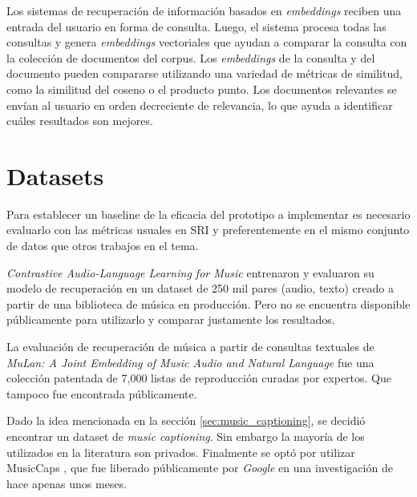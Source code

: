 Los sistemas de recuperación de información basados en \textit{embeddings} reciben una entrada del usuario en forma de consulta. Luego, el sistema procesa todas las consultas y genera \textit{embeddings} vectoriales que ayudan a comparar la consulta con la colección de documentos del corpus. Los \textit{embeddings} de la consulta y del documento pueden compararse utilizando una variedad de métricas de similitud, como la similitud del coseno o el producto punto. Los documentos relevantes se envían al usuario en orden decreciente de relevancia, lo que ayuda a identificar cuáles resultados son mejores.

\section{Datasets}
\label{sec:datasets}

Para establecer un baseline de la eficacia del prototipo a implementar es necesario evaluarlo con las métricas usuales en SRI y preferentemente en el mismo conjunto de datos que otros trabajos en el tema. 

\textit{Contrastive Audio-Language Learning for Music} \cite{Manco2022ContrastiveAL} entrenaron y evaluaron su modelo de recuperación en un dataset de 250 mil pares (audio, texto) creado a partir de una biblioteca de música en producción. Pero no se encuentra disponible públicamente para utilizarlo y comparar justamente los resultados.

La evaluación de recuperación de música a partir de consultas textuales de \textit{MuLan: A Joint Embedding of Music Audio and Natural Language} \cite{Huang2022MuLanAJ} fue una colección patentada de 7,000 listas de reproducción curadas por expertos. Que tampoco fue encontrada públicamente.

Dado la idea mencionada en la sección \ref{sec:music_captioning}, se decidió encontrar un dataset de \textit{music captioning}. Sin embargo la mayoría de los utilizados en la literatura son privados. Finalmente se optó por utilizar MusicCaps \cite{Agostinelli2023MusicLMGM}, que fue liberado públicamente por \textit{Google} en una investigación de hace apenas unos meses. 

